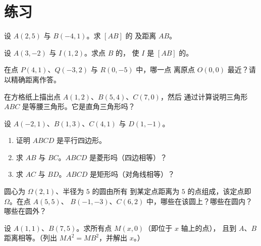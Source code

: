 \section{练习}

\begin{exercise}[$\star$]\label{exo:g10:coordgeom:1}
设 $A(2, 5)$ 与 $B(-4, 1)$。求 $[AB]$ 的
及距离 $AB$。
\end{exercise}

\begin{exercise}[$\star$]\label{exo:g10:coordgeom:2}
设 $A(3, -2)$ 与 $I(1, 2)$。求点 $B$ 的，
使 $I$ 是 $[AB]$ 的。
\end{exercise}

\begin{exercise}[$\star$]\label{exo:g10:coordgeom:3}
在点 $P(4, 1)$、$Q(-3, 2)$ 与 $R(0, -5)$ 中，哪一点
离原点 $O(0,0)$ 最近？请以精确距离作答。
\end{exercise}

\begin{exercise}[$\star$]\label{exo:g10:coordgeom:4}
在方格纸上描出点 $A(1, 2)$、$B(5, 4)$、$C(7, 0)$，然后
通过计算说明三角形 $ABC$ 是等腰三角形。它是直角三角形吗？
\end{exercise}

\begin{exercise}[$\star\star$]\label{exo:g10:coordgeom:5}
设 $A(-2, 1)$、$B(1, 3)$、$C(4, 1)$ 与 $D(1, -1)$。
\begin{enumerate}
  \item 证明 $ABCD$ 是平行四边形。
  \item 求 $AB$ 与 $BC$。$ABCD$ 是菱形吗（四边相等）？
  \item 求 $AC$ 与 $BD$。$ABCD$ 是矩形吗（对角线相等）？
\end{enumerate}
\end{exercise}

\begin{exercise}[$\star\star$]\label{exo:g10:coordgeom:6}
圆心为 $\Omega(2, 1)$、半径为 $5$ 的圆由所有
到某定点距离为 $5$ 的点组成，该定点即 $\Omega$。在点 $A(5, 5)$、
$B(-1, -3)$、$C(6, 2)$ 中，哪些在该圆上？哪些在圆内？哪些在圆外？
\end{exercise}

\begin{exercise}[$\star\star$]\label{exo:g10:coordgeom:7}
设 $A(1, 1)$、$B(7, 5)$。求所有点 $M(x, 0)$（即位于 $x$ 轴上的点），
且到 $A$、$B$ 距离相等。（列出 $MA^2 = MB^2$，并解出
$x$。）
\end{exercise}

